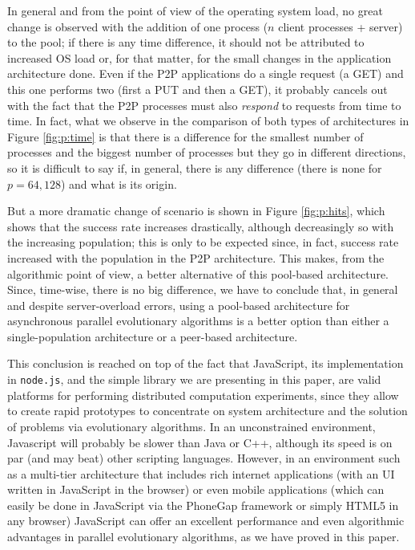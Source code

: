 \documentclass{sig-alternate}
\begin{document}
In general and from the point of view of the operating system load, no
great change is observed with the addition of one process ($n$ client
processes + server) to the pool; if there is any time difference, it
should not be attributed to increased OS load or, for that matter, for
the small changes in the application architecture done. Even if the
P2P applications do a single request (a GET) and this one performs two
(first a PUT and then a GET), it probably cancels out with the fact
that the P2P processes must also {\em respond} to requests from time
to time. In fact, what we observe in the comparison of both types of
architectures in Figure \ref{fig:p:time} is that there is a difference
for the smallest number of processes and the biggest number of
processes but they go in different directions, so it is difficult to
say if, in general, there is any difference (there is none for
$p=64,128$) and what is its origin. 

But a more dramatic change of scenario is shown in Figure
\ref{fig:p:hits}, which shows that the success rate increases
drastically, although decreasingly so with the increasing population;
this is only to be expected since, in fact, success rate increased
with the population in the P2P architecture. This makes, from the
algorithmic point of view, a better alternative of this pool-based
architecture. Since, time-wise, there is no big difference, we have to
conclude that, in general and despite server-overload errors, using a
pool-based architecture for asynchronous parallel evolutionary
algorithms is a better option than either a single-population
architecture or a peer-based architecture. 

This conclusion is reached on top of the fact that JavaScript, its
implementation in {\tt node.js}, and the simple library we are presenting in
this paper, are valid platforms for performing distributed computation
experiments, since they allow to create rapid prototypes to
concentrate on system architecture and the solution of problems via
evolutionary algorithms. In an unconstrained environment, Javascript will probably be slower than Java or C++, although its speed is on par (and may beat) other scripting languages. However, in an environment such as a multi-tier architecture that includes rich internet applications (with an UI written in JavaScript in the browser) or even mobile applications (which can easily be done in JavaScript via the PhoneGap framework or simply HTML5 in any browser) JavaScript can offer an excellent performance and even algorithmic advantages in parallel evolutionary algorithms, as we have proved in this paper. 
\end{document}
